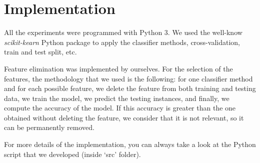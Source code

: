 \section{Implementation}
\label{sec:implementation}

All the experiments were programmed with Python 3. We used the well-know \textit{scikit-kearn} \cite{scikit-learn} Python package to apply the classifier methods, cross-validation, train and test split, etc. 

Feature elimination was implemented by ourselves. For the selection of the features, the methodology that we used is the following: for one classifier method and for each possible feature, we delete the feature from both training and testing data, we train the model, we predict the testing instances, and finally, we compute the accuracy of the model. If this accuracy is greater than the one obtained without deleting the feature, we consider that it is not relevant, so it can be permanently removed.

For more details of the implementation, you can always take a look at the Python script that we developed (inside `src' folder).